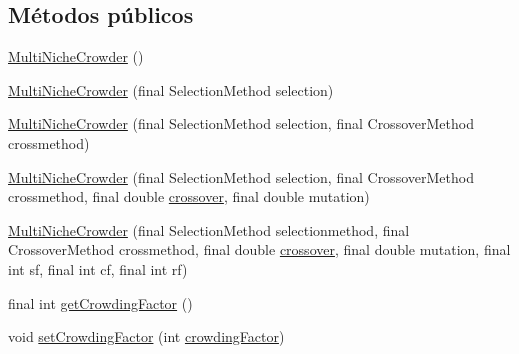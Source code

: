 \subsection*{Métodos públicos}
\begin{DoxyCompactItemize}
\item 
\hyperlink{classjenes_1_1stage_1_1operator_1_1common_1_1_multi_niche_crowder_3_01_t_01extends_01_chromosome_01_4_a0e3210ea1f2d3f1687f5c1f9a0f326dd}{Multi\-Niche\-Crowder} ()
\item 
\hyperlink{classjenes_1_1stage_1_1operator_1_1common_1_1_multi_niche_crowder_3_01_t_01extends_01_chromosome_01_4_a45d8181936a9298ecc7edcfee8647590}{Multi\-Niche\-Crowder} (final Selection\-Method selection)
\item 
\hyperlink{classjenes_1_1stage_1_1operator_1_1common_1_1_multi_niche_crowder_3_01_t_01extends_01_chromosome_01_4_a5f539242ac756ac79df20945afc5e425}{Multi\-Niche\-Crowder} (final Selection\-Method selection, final Crossover\-Method crossmethod)
\item 
\hyperlink{classjenes_1_1stage_1_1operator_1_1common_1_1_multi_niche_crowder_3_01_t_01extends_01_chromosome_01_4_ad6b691057f10397e80669b101c7f437a}{Multi\-Niche\-Crowder} (final Selection\-Method selection, final Crossover\-Method crossmethod, final double \hyperlink{classjenes_1_1stage_1_1operator_1_1common_1_1_multi_niche_crowder_3_01_t_01extends_01_chromosome_01_4_ad584be099b23576ec3379a6867d31ef4}{crossover}, final double mutation)
\item 
\hyperlink{classjenes_1_1stage_1_1operator_1_1common_1_1_multi_niche_crowder_3_01_t_01extends_01_chromosome_01_4_a7384c823b16fe8e5f8bfdc7db0c87ce5}{Multi\-Niche\-Crowder} (final Selection\-Method selectionmethod, final Crossover\-Method crossmethod, final double \hyperlink{classjenes_1_1stage_1_1operator_1_1common_1_1_multi_niche_crowder_3_01_t_01extends_01_chromosome_01_4_ad584be099b23576ec3379a6867d31ef4}{crossover}, final double mutation, final int sf, final int cf, final int rf)
\item 
final int \hyperlink{classjenes_1_1stage_1_1operator_1_1common_1_1_multi_niche_crowder_3_01_t_01extends_01_chromosome_01_4_a74363393b7e200fcff467ff5920e10d6}{get\-Crowding\-Factor} ()
\item 
void \hyperlink{classjenes_1_1stage_1_1operator_1_1common_1_1_multi_niche_crowder_3_01_t_01extends_01_chromosome_01_4_ad00602ac8b97b385a8a72fd612e2ac22}{set\-Crowding\-Factor} (int \hyperlink{classjenes_1_1stage_1_1operator_1_1common_1_1_multi_niche_crowder_3_01_t_01extends_01_chromosome_01_4_ad7320907a72bd19c028f922383667560}{crowding\-Factor})

\end{DoxyCompactItemize}
